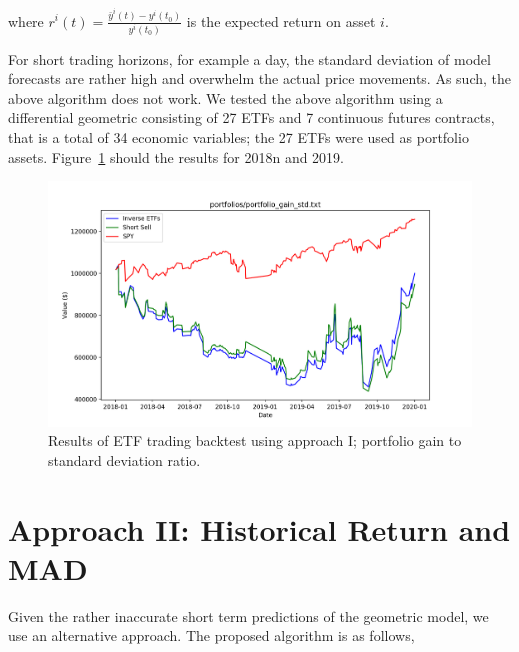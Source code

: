 \documentclass{article}
\begin{document}
where $r^{i}(t) = \frac{\bar{y}^{i}(t)-y^{i}(t_{0})}{y^{i}(t_{0})}$ is
the expected return on asset $i$.

For short trading horizons, for example a day, the standard deviation
of model forecasts are rather high and overwhelm the actual price
movements. As such, the above algorithm does not work. We tested the
above algorithm using a differential geometric consisting of 27 ETFs
and 7 continuous futures contracts, that is a total of 34 economic
variables; the 27 ETFs were used as portfolio
assets. Figure~\ref{fig:etf-results-approach-1} should the results for
2018n and 2019.

\begin{figure}
\includegraphics[scale=0.42,bb=0 0 320 240]{figures/Gain_std_maximization.png}
\caption{Results of ETF trading backtest using approach I; portfolio
  gain to standard deviation ratio.}
\label{fig:etf-results-approach-1}
\end{figure}

\section{Approach II: Historical Return and MAD}\label{section:approach-2}

Given the rather inaccurate short term predictions of the geometric
model, we use an alternative approach. The proposed algorithm is as
follows,
\end{document}
